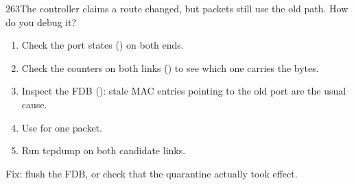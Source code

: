 \begin{qa}{263}{The controller claims a route changed, but packets still use the old path. How do you debug it?}
\begin{enumerate}
\item Check the port states () on both ends.
\item Check the counters on both links () to see which one carries the bytes.
\item Inspect the FDB (): stale MAC entries pointing to the old port are the usual cause.
\item Use  for one packet.
\item Run tcpdump on both candidate links.
\end{enumerate}
Fix: flush the FDB, or check that the quarantine actually took effect.
\end{qa}
